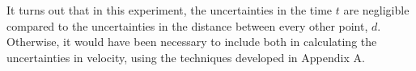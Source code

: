 \begin{itemize}
%

\end{itemize}


It turns out that in this experiment, the uncertainties in the time
$t$
are negligible compared to the uncertainties in the distance between
every other point, $d$.
Otherwise, it would have been necessary to include both in calculating
the uncertainties in velocity, using the techniques developed in
Appendix A.

%
%


